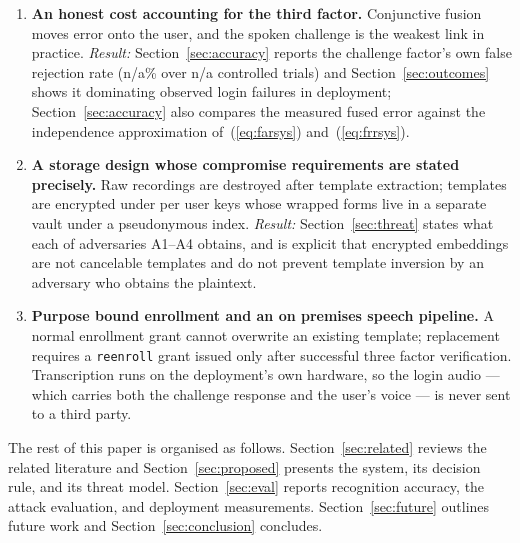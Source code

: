 \documentclass[runningheads]{llncs}
\providecommand{\EvalChallengeFRR}{n/a}
\providecommand{\EvalChallengeTrials}{n/a}
\begin{document}
{\begin{enumerate}[leftmargin=*,itemsep=2pt,topsep=3pt]
\item \textbf{An honest cost accounting for the third factor.} Conjunctive fusion moves error onto the user, and the spoken challenge is the weakest link in practice. \emph{Result:} Section~\ref{sec:accuracy} reports the challenge factor's own false rejection rate (\EvalChallengeFRR\% over \EvalChallengeTrials{} controlled trials) and Section~\ref{sec:outcomes} shows it dominating observed login failures in deployment; Section~\ref{sec:accuracy} also compares the measured fused error against the independence approximation of~(\ref{eq:farsys}) and~(\ref{eq:frrsys}).

\item \textbf{A storage design whose compromise requirements are stated precisely.} Raw recordings are destroyed after template extraction; templates are encrypted under per user keys whose wrapped forms live in a separate vault under a pseudonymous index. \emph{Result:} Section~\ref{sec:threat} states what each of adversaries A1--A4 obtains, and is explicit that encrypted embeddings are not cancelable templates and do not prevent template inversion by an adversary who obtains the plaintext.

\item \textbf{Purpose bound enrollment and an on premises speech pipeline.} A normal enrollment grant cannot overwrite an existing template; replacement requires a \texttt{reenroll} grant issued only after successful three factor verification. Transcription runs on the deployment's own hardware, so the login audio --- which carries both the challenge response and the user's voice --- is never sent to a third party.
\end{enumerate}

The rest of this paper is organised as follows. Section~\ref{sec:related} reviews the related literature and Section~\ref{sec:proposed} presents the system, its decision rule, and its threat model. Section~\ref{sec:eval} reports recognition accuracy, the attack evaluation, and deployment measurements. Section~\ref{sec:future} outlines future work and Section~\ref{sec:conclusion} concludes.
}
\end{document}
